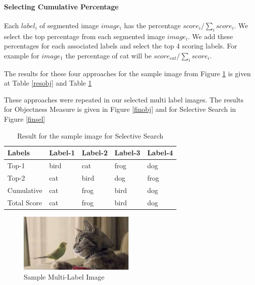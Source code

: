 \paragraph{Selecting Cumulative Percentage}
Each $label_{i}$ of segmented image $image_{i}$ has the percentage $score_{i} / \sum_{i}{score_{i}}$. We select the top percentage from each segmented image $image_{i}$. We add these percentages for each associated labels and select the top 4 scoring labels. For example for $image_{1}$ the percentage of cat will be $score_{cat} / \sum_{i}{score_{i}}$.\hfill \break

The results for these four approaches for the sample image from Figure \ref{sample_multi_label} is given at Table \ref{resobj} and Table \ref{ressel} \hfill \break


These approaches were repeated in our selected multi label images. The results for Objectness Measure is given in Figure \ref{finobj} and for Selective Search in Figure  \ref{finsel}

\begin{table}
\centering
\caption{Result for the sample image for Selective Search}
\label{ressel}
\begin{tabularx}{\linewidth}{|*{5}{X|}}
\hline
Labels      & Label-1 & Label-2 & Label-3 & Label-4 \\ \hline
Top-1       & bird    & cat     & frog    & dog           \\ \hline
Top-2       & cat     & bird    & dog     & frog           \\ \hline
Cumulative  & cat     & frog    & bird    & dog            \\ \hline
Total Score & cat     & frog    & bird    & dog           \\ \hline
\end{tabularx}
\end{table}

\begin{figure}
  \centering
  \includegraphics[width=0.5\textwidth]{images/sample_multi_label.PNG}
  \caption{Sample Multi-Label Image}\label{sample_multi_label}
\end{figure}


